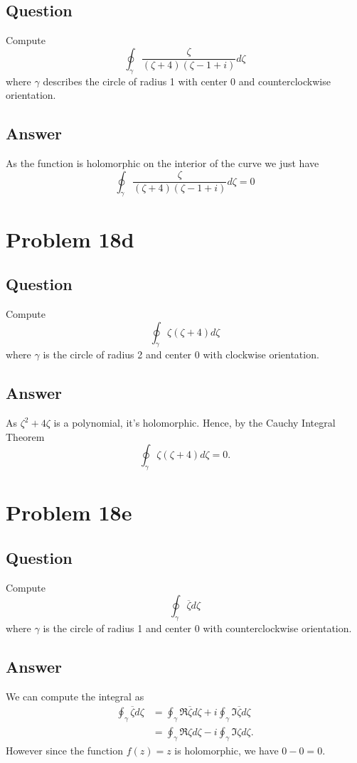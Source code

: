 \documentclass[11pt]{article}
\begin{document}
\subsection{Question}
Compute
\[\oint_\gamma \frac{\zeta}{(\zeta+4)(\zeta-1+i)} d \zeta\]
where $\gamma$ describes the circle of radius 1 with center 0 and counterclockwise orientation.
\subsection{Answer}
As the function is  holomorphic on the interior of the curve we just have
\[\oint_\gamma \frac{\zeta}{(\zeta+4)(\zeta-1+i)} d \zeta = 0\]

\section{Problem  18d}
\subsection{Question}
Compute 
\[\oint_\gamma \zeta(\zeta+4) d\zeta\]
where $\gamma$ is the circle of radius 2 and center 0 with clockwise orientation.
\subsection{Answer}
As $\zeta^2 + 4 \zeta$ is a polynomial, it's holomorphic. Hence, by the Cauchy Integral Theorem
\[\oint_\gamma \zeta(\zeta+4) d\zeta = 0.\]


\section{Problem  18e}
\subsection{Question}
Compute
\[\oint_\gamma \overline{\zeta} d\zeta\]
where $\gamma$ is the circle of radius 1 and center 0 with counterclockwise orientation.
\subsection{Answer}
We can compute the integral as
\begin{align*}\oint_\gamma \overline{\zeta} d\zeta &= \oint_\gamma \Re \overline{\zeta} d\zeta + i \oint_\gamma \Im \overline{\zeta} d\zeta\\
&=  \oint_\gamma \Re \zeta d\zeta - i \oint_\gamma \Im \zeta d\zeta.
\end{align*}
However since the function $f(z) = z $ is holomorphic, we have $0-0=0$.
\end{document}
